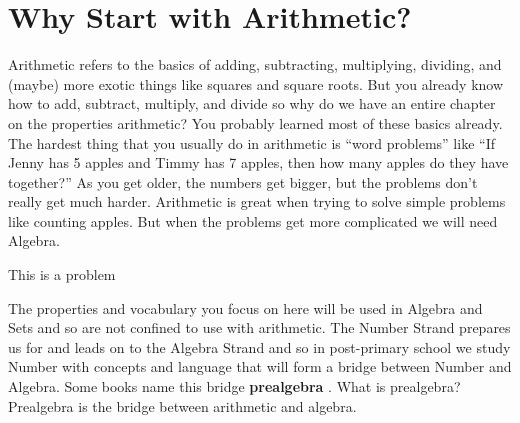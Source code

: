 





\section{Why Start with Arithmetic?}
Arithmetic refers to the basics of adding, subtracting, multiplying, dividing, and (maybe) more exotic things like squares and square roots.
But you already know how to add, subtract, multiply, and divide  so why do we have an entire chapter on the properties arithmetic?  You probably learned most of these basics already. The hardest thing that you usually do in arithmetic is “word problems” like “If Jenny has 5 apples and Timmy has 7 apples, then how many apples do they have together?” As you get older, the numbers get bigger, but the problems don’t really get much harder. Arithmetic is great when trying to solve simple problems like counting apples. But when the problems get more complicated we will need Algebra.





\operation{}







\begin{problem}
This is a problem
\end{problem}


\begin{connection}
The properties and vocabulary you focus on here will be used in Algebra and Sets and so are not confined to use with arithmetic. The Number Strand prepares us for and leads on to the Algebra Strand and so in post-primary school we study Number with concepts and language that will form a bridge between Number and Algebra. Some books name this bridge \textbf{prealgebra} . What is prealgebra?  Prealgebra is the bridge between arithmetic and algebra.
\end{connection}






